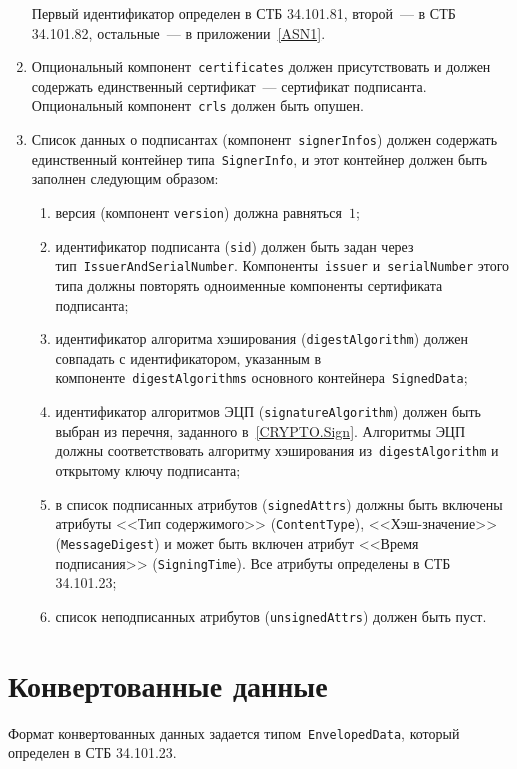 \begin{enumerate}
Первый идентификатор определен в СТБ 34.101.81, второй~--- в СТБ 
34.101.82, остальные~--- в приложении~\ref{ASN1}.

\item
Опциональный компонент~\texttt{certificates} должен присутствовать и 
должен содержать единственный сертификат~--- сертификат подписанта.
%
Опциональный компонент~\texttt{crls} должен быть опушен.

\item
Список данных о подписантах (компонент~\texttt{signerInfos}) должен 
содержать единственный контейнер типа~\texttt{SignerInfo}, и этот 
контейнер должен быть заполнен следующим образом: 
\begin{enumerate}
\item
версия (компонент \texttt{version}) должна равняться~$1$;
\item
идентификатор подписанта (\texttt{sid}) должен быть задан через
тип~\texttt{IssuerAndSerialNumber}. Компоненты~\texttt{issuer} 
и~\texttt{serialNumber} этого типа должны повторять одноименные компоненты 
сертификата подписанта;
\item
идентификатор алгоритма хэширования (\texttt{digestAlgorithm}) должен 
совпадать с идентификатором, указанным в 
компоненте~\texttt{digestAlgorithms} основного  
контейнера~\texttt{SignedData};
\item
идентификатор алгоритмов ЭЦП (\texttt{signatureAlgorithm}) должен 
быть выбран из перечня, заданного в~\ref{CRYPTO.Sign}. 
Алгоритмы ЭЦП должны соответствовать алгоритму хэширования
из~\texttt{digestAlgorithm} и открытому ключу подписанта;
\item
в список подписанных атрибутов (\texttt{signedAttrs}) должны 
быть включены атрибуты <<Тип содержимого>> (\texttt{ContentType}),
<<Хэш-значение>> (\texttt{MessageDigest}) и может быть включен
атрибут <<Время подписания>> (\texttt{SigningTime}). 
Все атрибуты определены в СТБ 34.101.23;
\item
список неподписанных атрибутов (\texttt{unsignedAttrs}) должен быть пуст.
\end{enumerate}
\end{enumerate}

\section{Конвертованные данные}\label{FMT.EnvelopedData}

Формат конвертованных данных задается типом~\texttt{EnvelopedData}, который
определен в СТБ 34.101.23. 

